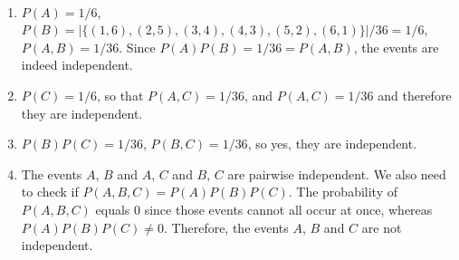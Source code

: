 \begin{problem}{34} $ $

	\begin{enumerate}
	
		\item $P(A) = 1/6$, $P(B) = |\{ (1, 6), (2, 5), (3, 4), (4, 3), (5, 2), (6, 1) \} |/36 = 1/6$, $P(A, B) = 1/36$.  Since $P(A)P(B) = 1/36 = P(A, B)$, the events are indeed independent.
		
		\item $P(C) = 1/6$, so that $P(A, C) = 1/36$, and $P(A, C) = 1/36$ and therefore they are independent.
		
		\item $P(B) P(C) = 1/36$, $P(B, C) = 1/36$, so yes, they are independent.
		
		\item The events $A$, $B$ and $A$, $C$ and $B$, $C$ are pairwise independent.  We also need to check if $P(A, B, C) =P(A)P(B)P(C)$.  The probability of $P(A, B, C)$ equals 0 since those events cannot all occur at once, whereas $P(A)P(B)P(C) \ne 0$.  Therefore, the events $A$, $B$ and $C$ are not independent.

	\end{enumerate}

\end{problem}

